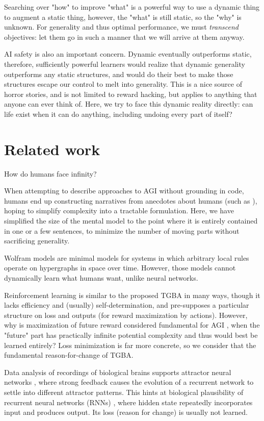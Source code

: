 \documentclass{article}
\begin{document}
Searching over "how" to improve "what" is a powerful way to use a dynamic thing to augment a static thing, however, the "what" is still static, so the "why" is unknown. For generality and thus optimal performance, we must \textit{transcend} objectives: let them go in such a manner that we will arrive at them anyway.

AI safety is also an important concern. Dynamic eventually outperforms static, therefore, sufficiently powerful learners would realize that dynamic generality outperforms any static structures, and would do their best to make those structures escape our control to melt into generality. This is a nice source of horror stories, and is not limited to reward hacking, but applies to anything that anyone can ever think of. Here, we try to face this dynamic reality directly: can life exist when it can do anything, including undoing every part of itself?

\section{Related work}

How do humans face infinity?

When attempting to describe approaches to AGI without grounding in code, humans end up constructing narratives from anecdotes about humans (such as \cite{DBLP:journals/corr/abs-2102-03406}), hoping to simplify complexity into a tractable formulation. Here, we have simplified the size of the mental model to the point where it is entirely contained in one or a few sentences, to minimize the number of moving parts without sacrificing generality.

Wolfram models \cite{Wolfram_2020} are minimal models for systems in which arbitrary local rules operate on hypergraphs in space over time. However, those models cannot dynamically learn what humans want, unlike neural networks.

Reinforcement learning is similar to the proposed TGBA in many ways, though it lacks efficiency and (usually) self-determination, and pre-supposes a particular structure on loss and outputs (for reward maximization by actions). However, why is maximization of future reward considered fundamental for AGI \cite{SILVER2021103535}, when the "future" part has practically infinite potential complexity and thus would best be learned entirely? Loss minimization is far more concrete, so we consider that the fundamental reason-for-change of TGBA.

Data analysis of recordings of biological brains supports attractor neural networks \cite{AMIT1990111}, where strong feedback causes the evolution of a recurrent network to settle into different attractor patterns. This hints at biological plausibility of recurrent neural networks (RNNs) \cite{1986Natur.323.533R}, where hidden state repeatedly incorporates input and produces output. Its loss (reason for change) is usually not learned.
\end{document}
